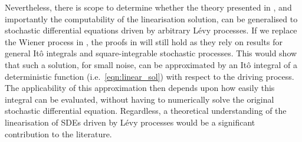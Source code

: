 Nevertheless, there is scope to determine whether the theory presented in , and importantly the computability of the linearisation solution, can be generalised to stochastic differential equations driven by arbitrary L\'evy processes.
If we replace the Wiener process in , the proofs in  will still hold as they rely on results for general It\^o integrals and square-integrable stochastic processes.
This would show that such a solution, for small noise, can be approximated by an It\^o integral of a deterministic function (i.e.\ \cref{eqn:linear_sol}) with respect to the driving process.
The applicability of this approximation then depends upon how easily this integral can be evaluated, without having to numerically solve the original stochastic differential equation.
Regardless, a theoretical understanding of the linearisation of SDEs driven by L\'evy processes would be a significant contribution to the literature.



